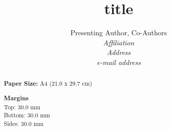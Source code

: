 \documentclass[10pt,a4paper]{article}
\title{ title }
\author{Presenting Author, Co-Authors\\
\textit{Affiliation}\\
\textit{Address}\\
\textit{e-mail address}}
\date{} %
\begin{document}
\maketitle

\begin{abstract}

\textbf{Paper Size:} A4 (21.0 x 29.7 cm)

\textbf{Margins} \\
Top: 30.0 mm \\
Bottom: 30.0 mm \\
Sides: 30.0 mm
\end{abstract}

\end{document}
